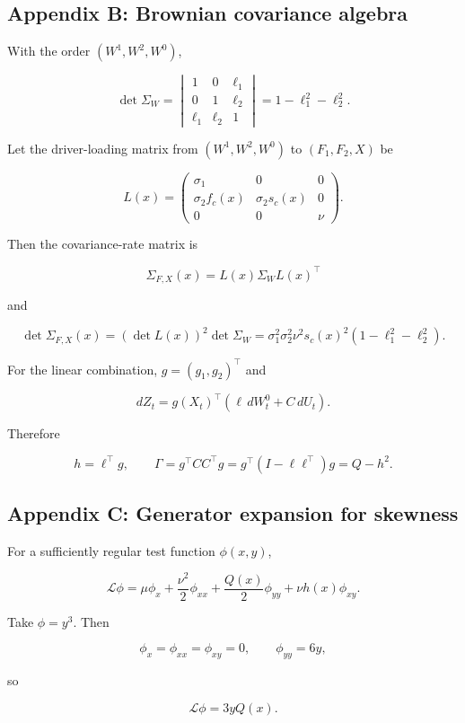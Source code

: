 \documentclass[
  english,
  11pt,
  letterpaper,
  DIV=11,
  numbers=noendperiod]{scrartcl}
\theoremstyle{plain}
\theoremstyle{plain}
\theoremstyle{plain}
\theoremstyle{plain}
\theoremstyle{remark}
\begin{document}
\subsection{Appendix B: Brownian covariance
algebra}\label{sec-app-leverage}

With the order \((W^1,W^2,W^0)\),

\[
\det\Sigma_W
=
\begin{vmatrix}
1&0&\ell_1\\
0&1&\ell_2\\
\ell_1&\ell_2&1
\end{vmatrix}
=1-\ell_1^2-\ell_2^2.
\]

Let the driver-loading matrix from \((W^1,W^2,W^0)\) to \((F_1,F_2,X)\)
be

\[
L(x)=
\begin{pmatrix}
\sigma_1&0&0\\
\sigma_2f_c(x)&\sigma_2s_c(x)&0\\
0&0&\nu
\end{pmatrix}.
\]

Then the covariance-rate matrix is

\[
\Sigma_{F,X}(x)=L(x)\Sigma_WL(x)^\top
\]

and

\[
\det\Sigma_{F,X}(x)
=(\det L(x))^2\det\Sigma_W
=\sigma_1^2\sigma_2^2\nu^2s_c(x)^2
(1-\ell_1^2-\ell_2^2).
\]

For the linear combination, \(g=(g_1,g_2)^\top\) and

\[
dZ_t=g(X_t)^\top
\left(
\ell\,dW_t^0+C\,dU_t
\right).
\]

Therefore

\[
h=\ell^\top g,\qquad
\Gamma=g^\top CC^\top g
=g^\top(I-\ell\ell^\top)g
=Q-h^2.
\]

\subsection{Appendix C: Generator expansion for
skewness}\label{sec-app-skew}

For a sufficiently regular test function \(\phi(x,y)\),

\[
\mathcal L\phi
=\mu\phi_x+\frac{\nu^2}{2}\phi_{xx}
+\frac{Q(x)}2\phi_{yy}
+\nu h(x)\phi_{xy}.
\]

Take \(\phi=y^3\). Then

\[
\phi_x=\phi_{xx}=\phi_{xy}=0,\qquad
\phi_{yy}=6y,
\]

so

\[
\mathcal L\phi=3yQ(x).
\]
\end{document}
